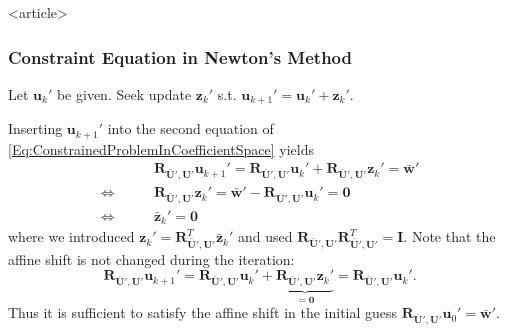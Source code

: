 \begin{frame}<article>
\frametitle<presentation>{Constraint Equation in Newton's Method}
Let $\mathbf{u}_{k}'$ be given.  Seek update $\mathbf{z}_{k}'$ s.t.
$\mathbf{u}_{k+1}' = \mathbf{u}_{k}' + \mathbf{z}_{k}'$.

Inserting $\mathbf{u}_{k+1}'$ into the second equation of
\eqref{Eq:ConstrainedProblemInCoefficientSpace} yields
\begin{equation}\label{Eq:SideCond}
\begin{split}
& \mathbf{R}_{\bar{\mathbf{U}}',\mathbf{U}'} \mathbf{u}_{k+1}'
= \mathbf{R}_{\bar{\mathbf{U}}',\mathbf{U}'} \mathbf{u}_{k}' +
\mathbf{R}_{\bar{\mathbf{U}}',\mathbf{U}'} \mathbf{z}_{k}'
 =  \bar{\mathbf{w}}'\\
\Leftrightarrow\qquad &
\mathbf{R}_{\bar{\mathbf{U}}',\mathbf{U}'} \mathbf{z}_{k}' =
\bar{\mathbf{w}}' - \mathbf{R}_{\bar{\mathbf{U}}',\mathbf{U}'}
\mathbf{u}_{k}' = \mathbf{0}\\
\Leftrightarrow\qquad &
\bar{\mathbf{z}}_{k}' = \mathbf{0}
\end{split}
\end{equation}
where we introduced $\mathbf{z}_{k}' =
\mathbf{R}^T_{\bar{\mathbf{U}}',\mathbf{U}'}
\bar{\mathbf{z}}_{k}'$ and used $\mathbf{R}_{\bar{\mathbf{U}}',\mathbf{U}'}
\mathbf{R}^T_{\bar{\mathbf{U}}',\mathbf{U}'}=\mathbf{I}$.
Note that the affine shift is not changed during the iteration:
\begin{equation}
\mathbf{R}_{\bar{\mathbf{U}}',\mathbf{U}'}\mathbf{u}_{k+1}' =
\mathbf{R}_{\bar{\mathbf{U}}',\mathbf{U}'} \mathbf{u}_{k}' +
\underbrace{\mathbf{R}_{\bar{\mathbf{U}}',\mathbf{U}'}
  \mathbf{z}_{k}'}_{= \mathbf{0}} =
\mathbf{R}_{\bar{\mathbf{U}}',\mathbf{U}'} \mathbf{u}_{k}' .
\end{equation}
Thus it is sufficient to satisfy the affine shift in the initial
guess $\mathbf{R}_{\bar{\mathbf{U}}',\mathbf{U}'} \mathbf{u}_{0}' =
\bar{\mathbf{w}}'$.
\end{frame}

